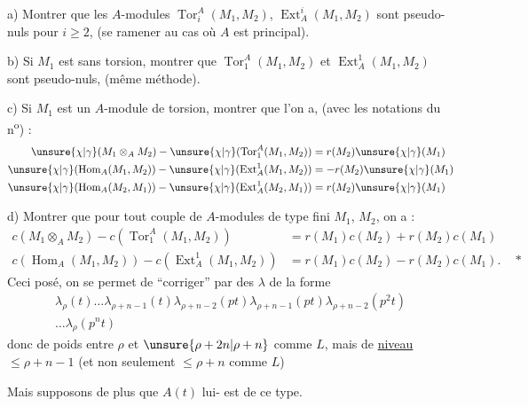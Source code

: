 a) Montrer que les $A$-modules $\operatorname{Tor}_i^A(M_1,M_2)$, $\operatorname{Ext}_A^i(M_1,M_2)$ sont pseudo-nuls pour $i\geq2$, (se ramener au cas où $A$ est principal).

b) Si $M_1$ est sans torsion, montrer que $\operatorname{Tor}_1^A(M_1,M_2)$ et $\operatorname{Ext}_A^1(M_1,M_2)$ sont pseudo-nuls, (même méthode).

c) Si $M_1$ est un $A$-module de torsion, montrer que l'on a, (avec les notations du n\textsuperscript{o}\quad) :
\[
\begin{aligned}
\unsure{\chi|\gamma}(M_1\otimes_A M_2)-\unsure{\chi|\gamma}(\operatorname{Tor}_1^A(M_1,M_2))&=r(M_2)\unsure{\chi|\gamma}(M_1)\\
\unsure{\chi|\gamma}(\operatorname{Hom}_A(M_1,M_2))-\unsure{\chi|\gamma}(\operatorname{Ext}_A^1(M_1,M_2))&=-r(M_2)\unsure{\chi|\gamma}(M_1)\\
\unsure{\chi|\gamma}(\operatorname{Hom}_A(M_2,M_1))-\unsure{\chi|\gamma}(\operatorname{Ext}_A^1(M_2,M_1))&=r(M_2)\unsure{\chi|\gamma}(M_1)
\end{aligned}
\]

d) Montrer que pour tout couple de $A$-modules de type fini $M_1$, $M_2$, on a :
\[
\begin{aligned}
c(M_1\otimes_A M_2)-c(\operatorname{Tor}_1^A(M_1,M_2))&=r(M_1)c(M_2)+r(M_2)c(M_1)\\
c(\operatorname{Hom}_A(M_1,M_2))-c(\operatorname{Ext}_A^1(M_1,M_2))&=r(M_1)c(M_2)-r(M_2)c(M_1).\quad *
\end{aligned}
\]
Ceci posé, on  se permet de ``corriger'' par des $\lambda$  de la forme
\[
\begin{gathered}
\lambda_\rho(t)\ldots\lambda_{\rho+n-1}(t)\lambda_{\rho+n-2}(pt)\lambda_{\rho+n-1}(pt)\lambda_{\rho+n-2}(p^2t)\\
\ldots\lambda_\rho(p^nt)
\end{gathered}
\]
donc de poids entre $\rho$ et $\unsure{\rho+2n|\rho+n}$ comme $L$, mais de \uline{niveau} $\leq\rho+n-1$ (et non seulement $\leq\rho+n$ comme $L$)


Mais supposons de plus que $A(t)$ lui- est de  ce type.

